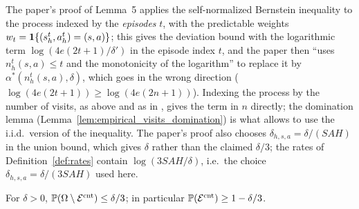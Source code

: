 \begin{remark}\label{rem:empirical_bernstein_index}
The paper's proof of Lemma~5 applies the self-normalized Bernstein inequality to the process
indexed by the \emph{episodes} $t$, with the predictable weights $w_t = \mathbf{1}\{(s^t_h, a^t_h) = (s, a)\}$;
this gives the deviation bound with the logarithmic term $\log(4e(2t + 1)/\delta')$ in the
episode index $t$, and the paper then ``uses $n_h^t(s, a) \le t$ and the monotonicity of the
logarithm'' to replace it by $\alpha^*(n_h^t(s, a), \delta)$, which goes in the wrong direction
($\log(4e(2t+1)) \ge \log(4e(2n+1))$). Indexing the process by the number of visits, as above
and as in \cite{menard2021fast}, gives the term in $n$ directly; the domination lemma
(Lemma~\ref{lem:empirical_visits_domination}) is what allows to use the i.i.d.\ version of the
inequality. The paper's proof also chooses $\delta_{h, s, a} = \delta/(SAH)$ in the union bound,
which gives $\delta$ rather than the claimed $\delta/3$; the rates of Definition~\ref{def:rates}
contain $\log(3SAH/\delta)$, i.e.\ the choice $\delta_{h, s, a} = \delta/(3SAH)$ used here.
\end{remark}

\begin{lemma}\label{lem:event_cnt_prob}
\leanok
{}
For $\delta > 0$, $\mathbb{P}(\Omega \setminus \mathcal{E}^{\mathrm{cnt}}) \le \delta/3$; in particular $\mathbb{P}(\mathcal{E}^{\mathrm{cnt}}) \ge 1 - \delta/3$.
\end{lemma}

